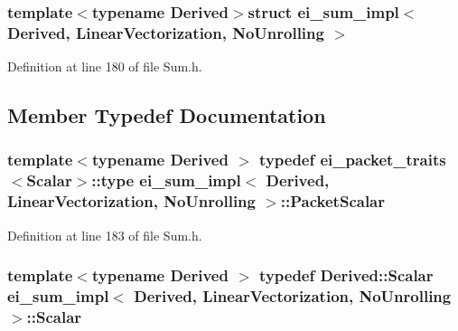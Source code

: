 \subsubsection*{template$<$typename Derived$>$struct ei\-\_\-sum\-\_\-impl$<$ Derived, Linear\-Vectorization, No\-Unrolling $>$}



Definition at line 180 of file Sum.\-h.



\subsection{Member Typedef Documentation}
\hypertarget{structei__sum__impl_3_01_derived_00_01_linear_vectorization_00_01_no_unrolling_01_4_af94e12fedd90b7ada7f51d40e6f4b37b}{
\subsubsection[{Packet\-Scalar}]{\setlength{\rightskip}{0pt plus 5cm}template$<$typename Derived $>$ typedef {\bf ei\-\_\-packet\-\_\-traits}$<${\bf Scalar}$>$\-::{\bf type} {\bf ei\-\_\-sum\-\_\-impl}$<$ Derived, {\bf Linear\-Vectorization}, {\bf No\-Unrolling} $>$\-::{\bf Packet\-Scalar}}}\label{structei__sum__impl_3_01_derived_00_01_linear_vectorization_00_01_no_unrolling_01_4_af94e12fedd90b7ada7f51d40e6f4b37b}


Definition at line 183 of file Sum.\-h.

\hypertarget{structei__sum__impl_3_01_derived_00_01_linear_vectorization_00_01_no_unrolling_01_4_aa106c26c2a9cf06300b204f811c40737}{
\subsubsection[{Scalar}]{\setlength{\rightskip}{0pt plus 5cm}template$<$typename Derived $>$ typedef Derived\-::\-Scalar {\bf ei\-\_\-sum\-\_\-impl}$<$ Derived, {\bf Linear\-Vectorization}, {\bf No\-Unrolling} $>$\-::{\bf Scalar}}}\label{structei__sum__impl_3_01_derived_00_01_linear_vectorization_00_01_no_unrolling_01_4_aa106c26c2a9cf06300b204f811c40737}


